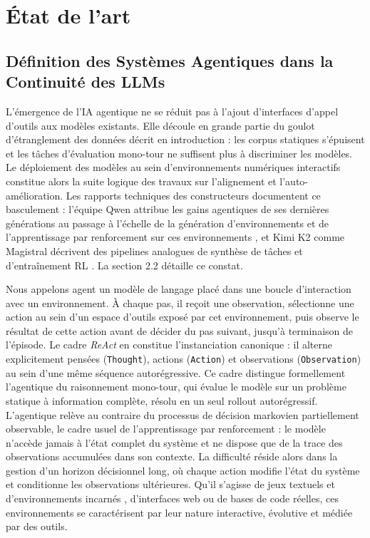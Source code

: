 \documentclass[11pt,a4paper]{article}
\begin{document}

\newpage
\section{État de l'art}

\subsection{Définition des Systèmes Agentiques dans la Continuité des LLMs}

L'émergence de l'IA agentique ne se réduit pas à l'ajout d'interfaces d'appel d'outils aux modèles existants. Elle découle en grande partie du goulot d'étranglement des données décrit en introduction : les corpus statiques s'épuisent et les tâches d'évaluation mono-tour ne suffisent plus à discriminer les modèles. Le déploiement des modèles au sein d'environnements numériques interactifs constitue alors la suite logique des travaux sur l'alignement et l'auto-amélioration. Les rapports techniques des constructeurs documentent ce basculement : l'équipe Qwen attribue les gains agentiques de ses dernières générations au passage à l'échelle de la génération d'environnements et de l'apprentissage par renforcement sur ces environnements \cite{qwen3coder2025, qwen35_2026}, et Kimi K2 comme Magistral décrivent des pipelines analogues de synthèse de tâches et d'entraînement RL \cite{kimik2_2025, magistral2025}. La section 2.2 détaille ce constat.

Nous appelons agent un modèle de langage placé dans une boucle d'interaction avec un environnement. À chaque pas, il reçoit une observation, sélectionne une action au sein d'un espace d'outils exposé par cet environnement, puis observe le résultat de cette action avant de décider du pas suivant, jusqu'à terminaison de l'épisode. Le cadre \emph{ReAct} \cite{yao2023react} en constitue l'instanciation canonique : il alterne explicitement pensées (\texttt{Thought}), actions (\texttt{Action}) et observations (\texttt{Observation}) au sein d'une même séquence autorégressive. Ce cadre distingue formellement l'agentique du raisonnement mono-tour, qui évalue le modèle sur un problème statique à information complète, résolu en un seul rollout autorégressif. L'agentique relève au contraire du processus de décision markovien partiellement observable, le cadre usuel de l'apprentissage par renforcement : le modèle n'accède jamais à l'état complet du système et ne dispose que de la trace des observations accumulées dans son contexte. La difficulté réside alors dans la gestion d'un horizon décisionnel long, où chaque action modifie l'état du système et conditionne les observations ultérieures. Qu'il s'agisse de jeux textuels et d'environnements incarnés \cite{shridhar2020alfworld}, d'interfaces web \cite{zhou2023webarena} ou de bases de code réelles, ces environnements se caractérisent par leur nature interactive, évolutive et médiée par des outils.
\end{document}
